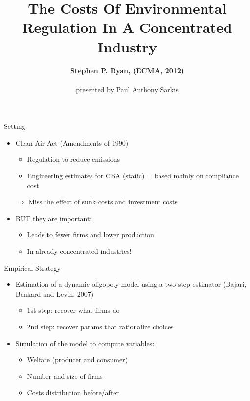 \documentclass[12pt]{beamer}
\author{\textbf{Stephen P. Ryan, (ECMA, 2012)}\\~\\
presented by Paul Anthony Sarkis}
\title{The Costs Of Environmental Regulation
In A Concentrated Industry}
\begin{document}
\begin{frame}
\titlepage
\end{frame}

\begin{frame}{Setting}
\begin{itemize}
\item Clean Air Act (Amendments of 1990)
\begin{itemize}
\item Regulation to reduce emissions
\item Engineering estimates for CBA (static) = based mainly on compliance cost
\item[]
\end{itemize}
\item[$\Rightarrow$] Miss the effect of sunk costs and investment costs 
\item[]
\item BUT they are important:
\begin{itemize}
\item Leads to fewer firms and lower production
\item In already concentrated industries!
\end{itemize}
\end{itemize}
\end{frame}

\begin{frame}{Empirical Strategy}
\begin{itemize}
\item Estimation of a dynamic oligopoly model using a two-step estimator (Bajari, Benkard and Levin, 2007)
\begin{itemize}
\item 1st step: recover what firms do
\item 2nd step: recover params that rationalize choices
\item[]
\end{itemize}
\item Simulation of the model to compute variables:
\begin{itemize}
\item Welfare (producer and consumer)
\item Number and size of firms
\item Costs distribution before/after
\end{itemize}
\end{itemize}
\end{frame}
\end{document}
